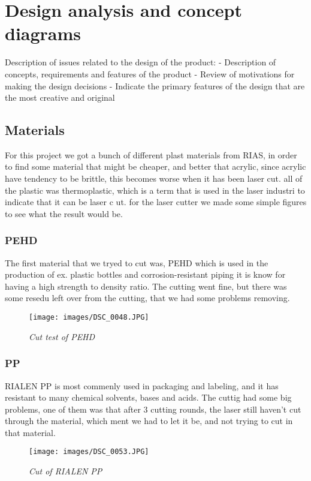 \section{Design analysis and concept diagrams}
Description of issues related to the design of the product:
- Description of concepts, requirements and features of the product
- Review of motivations for making the design decisions
- Indicate the primary features of the design that are the most creative and original

\subsection{Materials}
For this project we got a bunch of different plast materials from RIAS, in order to find some material that might be cheaper, and better that acrylic, since acrylic have tendency to be brittle, this becomes worse when it has been laser cut.
all of the plastic was thermoplastic, which is a term that is used in the laser industri to indicate that it can be laser c ut.
for the laser cutter we made some simple figures to see what the result would be.
\subsubsection{PEHD}
The first material that we tryed to cut was, PEHD which is used in the production of ex. plastic bottles and corrosion-resistant piping it is know for having a high strength to density ratio.
The cutting went fine, but there was some resedu left over from the cutting, that we had some problems removing.
\begin{figure}[h]
	\begin{center}
		\texttt{[image: images/DSC\_0048.JPG]}
		\caption{\small {\it {Cut test of PEHD}}} \label{fig:explode}
	\end{center}
\end{figure}
\subsubsection{ PP}
RIALEN PP  is most commenly used in packaging and labeling, and it has resistant to many chemical solvents, bases and acids.
The cuttig had some big problems, one of them was that after 3 cutting rounds, the laser still haven't cut through the material, which ment we had to let it be, and not trying to cut in that material. 
\begin{figure}[h]
	\begin{center}
		\texttt{[image: images/DSC\_0053.JPG]}
		\caption{\small {\it {Cut of RIALEN PP}}} \label{fig:explode}
	\end{center}
\end{figure}
